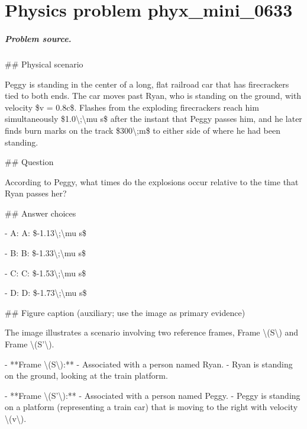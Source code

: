
\chapter{Physics problem phyx\_mini\_0633}
\label{ch:PhyXMiniProblems_problem_phyx_mini_0633}

\paragraph{Problem source.}
\#\# Physical scenario

Peggy is standing in the center of a long, flat railroad car that has firecrackers tied to both ends. The car moves past Ryan, who is standing on the ground, with velocity \$v = 0.8c\$. Flashes from the exploding firecrackers reach him simultaneously \$1.0\textbackslash{};\textbackslash{}mu s\$ after the instant that Peggy passes him, and he later finds burn marks on the track \$300\textbackslash{};m\$ to either side of where he had been standing.

\#\# Question

According to Peggy, what times do the explosions occur relative to the time that Ryan passes her?

\#\# Answer choices

- A: A: \$-1.13\textbackslash{};\textbackslash{}mu s\$

- B: B: \$-1.33\textbackslash{};\textbackslash{}mu s\$

- C: C: \$-1.53\textbackslash{};\textbackslash{}mu s\$

- D: D: \$-1.73\textbackslash{};\textbackslash{}mu s\$

\#\# Figure caption (auxiliary; use the image as primary evidence)

The image illustrates a scenario involving two reference frames, Frame \textbackslash{}(S\textbackslash{}) and Frame \textbackslash{}(S'\textbackslash{}). 

- **Frame \textbackslash{}(S\textbackslash{}):** 
  - Associated with a person named Ryan.
  - Ryan is standing on the ground, looking at the train platform.

- **Frame \textbackslash{}(S'\textbackslash{}):**
  - Associated with a person named Peggy.
  - Peggy is standing on a platform (representing a train car) that is moving to the right with velocity \textbackslash{}(v\textbackslash{}).

